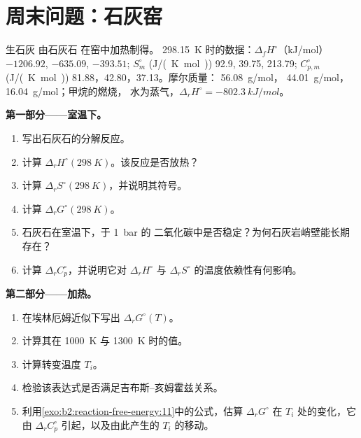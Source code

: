 \section{周末问题：石灰窑}

\begin{problem}
\label{pb:b2:reaction-free-energy:1}
生石灰  由石灰石  在窑中加热制得。
\qty{298.15}{K} 时的数据：$\Delta_f H^\circ$（\unit{kJ/mol}）
$-1206.92$,  $-635.09$,  $-393.51$; $S^\circ_m$
(\unit{J/(K.mol)}) 92.9, 39.75, 213.79; $C^\circ_{p,m}$ (\unit{J/(K.mol)})
81.88，42.80，37.13。摩尔质量： \qty{56.08}{g/mol}，
\qty{44.01}{g/mol}， \qty{16.04}{g/mol}；甲烷的燃烧，
水为蒸气，$\Delta_r H^\circ = \qty{-802.3}{kJ/mol}$。

\medskip
\noindent\textbf{第一部分——室温下。}
\begin{enumerate}
  \item 写出石灰石的分解反应。
  \item 计算 $\Delta_r H^\circ(\qty{298}{K})$。该反应是否放热？
  \item 计算 $\Delta_r S^\circ(\qty{298}{K})$，并说明其符号。
  \item 计算 $\Delta_r G^\circ(\qty{298}{K})$。
  \item 石灰石在室温下，于 \qty{1}{bar} 的
        二氧化碳中是否稳定？为何石灰岩峭壁能长期存在？
  \item 计算 $\Delta_r C^\circ_p$，并说明它对
        $\Delta_r H^\circ$ 与 $\Delta_r S^\circ$ 的温度依赖性有何影响。
\end{enumerate}

\medskip
\noindent\textbf{第二部分——加热。}
\begin{enumerate}[resume]
  \item 在埃林厄姆近似下写出 $\Delta_r G^\circ(T)$。
  \item 计算其在 \qty{1000}{K} 与 \qty{1300}{K} 时的值。
  \item 计算转变温度 $T_i$。
  \item 检验该表达式是否满足吉布斯–亥姆霍兹关系。
  \item 利用\cref{exo:b2:reaction-free-energy:11}中的公式，估算
        $\Delta_r G^\circ$ 在 $T_i$ 处的变化，它由
        $\Delta_r C^\circ_p$ 引起，以及由此产生的 $T_i$ 的移动。
\end{enumerate}


\end{problem}
